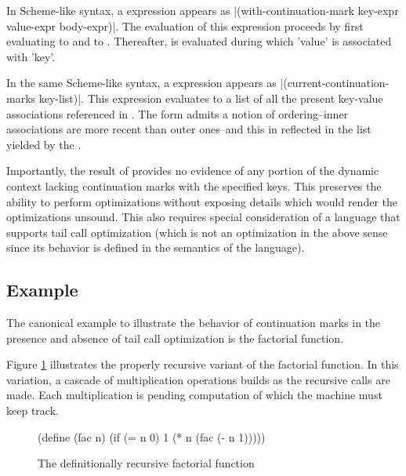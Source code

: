 In Scheme-like syntax, a  expression appears as
\scheme|(with-continuation-mark key-expr value-expr body-expr)|. The evaluation of this
expression proceeds by first evaluating  to  and
 to . Thereafter,  is evaluated during 
which \scheme'value' is associated with \scheme'key'.

In the same Scheme-like syntax, a  expression appears
as \scheme|(current-continuation-marks key-list)|. This expression evaluates to a list of
all the present key-value associations referenced in . The
 form admits a notion of ordering--inner associations are
more recent than outer ones--and this in reflected in the list yielded by the
.

Importantly, the result of  provides no evidence of any
portion of the dynamic context lacking continuation marks with the specified keys. This
preserves the ability to perform optimizations without exposing details which would render
the optimizations unsound. This also requires special consideration of a language that
supports tail call optimization (which is not an optimization in the above sense since its
behavior is defined in the semantics of the language).

\subsection{Example}

The canonical example to illustrate the behavior of continuation marks in the presence and
absence of tail call optimization is the factorial function.

Figure \ref{fig:fac-rec} illustrates the properly recursive variant of the factorial
function. In this variation, a cascade of multiplication operations builds as the
recursive calls are made. Each multiplication is pending computation of which the machine 
must keep track.

\begin{figure}
\begin{schemeblock}
\begin{schemedisplay}
(define (fac n)
  (if (= n 0)
      1
      (* n (fac (- n 1)))))
\end{schemedisplay}
\end{schemeblock}
\caption{The definitionally recursive factorial function}
\label{fig:fac-rec}
\end{figure}

